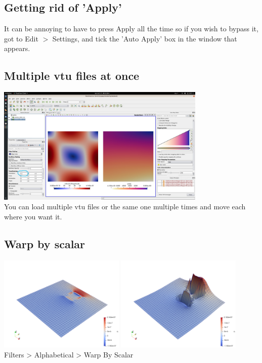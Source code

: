 \subsection*{Getting rid of 'Apply'}

It can be annoying to have to press Apply all the time so if you wish to bypass it, got to Edit $>$ Settings, and 
tick the 'Auto Apply' box in the window that appears.

\subsection*{Multiple vtu files at once}

\begin{center}
\includegraphics[width=10cm]{images/paraview/p14}\\
{\captionfont You can load multiple vtu files or the same one multiple times and move each where you want it.} 
\end{center}

\subsection*{Warp by scalar}

\begin{center}
\includegraphics[width=6cm]{images/paraview/p15a}
\includegraphics[width=6cm]{images/paraview/p15b}\\
{\captionfont Filters > Alphabetical > Warp By Scalar} 
\end{center}






